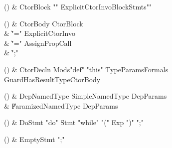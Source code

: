 \begin{bbgrammarappendix}{4.1in}

() & CtorBlock \label{prod:CtorBlock}  \: \xcd"{" ExplicitCtorInvo\opt BlockStmts\opt \xcd"}"  \\


\end{bbgrammarappendix}

\begin{bbgrammarappendix}{4.2in}

() & CtorBody \label{prod:CtorBody}  \: CtorBlock \\
 &    \| \xcd"=" ExplicitCtorInvo \\
 &    \| \xcd"=" AssignPropCall \\
 &    \| \xcd";" \\

\end{bbgrammarappendix}

\begin{bbgrammarappendix}{4.1in}

() & CtorDecln \label{prod:CtorDecln}  \: Mods\opt \xcd"def" \xcd"this" TypeParams\opt Formals Guard\opt HasResultType\opt CtorBody  \\


\end{bbgrammarappendix}

\begin{bbgrammarappendix}{3.8in}

() & DepNamedType \label{prod:DepNamedType}  \: SimpleNamedType DepParams  \\

 &    \| ParamizedNamedType DepParams \\

\end{bbgrammarappendix}

\begin{bbgrammarappendix}{4.4in}

() & DoStmt \label{prod:DoStmt}  \: \xcd"do" Stmt \xcd"while" \xcd"(" Exp \xcd")" \xcd";"  \\


\end{bbgrammarappendix}

\begin{bbgrammarappendix}{4.1in}

() & EmptyStmt \label{prod:EmptyStmt}  \: \xcd";"  \\


\end{bbgrammarappendix}

